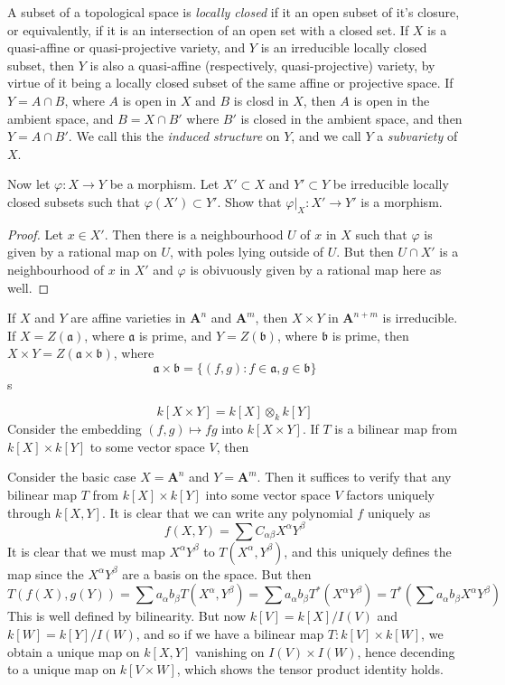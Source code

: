 A subset of a topological space is {\it locally closed} if it an open subset of it's closure, or equivalently, if it is an intersection of an open set with a closed set. If $X$ is a quasi-affine or quasi-projective variety, and $Y$ is an irreducible locally closed subset, then $Y$ is also a quasi-affine (respectively, quasi-projective) variety, by virtue of it being a locally closed subset of the same affine or projective space. If $Y = A \cap B$, where $A$ is open in $X$ and $B$ is closd in $X$, then $A$ is open in the ambient space, and $B = X \cap B'$ where $B'$ is closed in the ambient space, and then $Y = A \cap B'$. We call this the {\it induced structure} on $Y$, and we call $Y$ a {\it subvariety} of $X$.

\begin{theorem}
    Now let $\varphi: X \to Y$ be a morphism. Let $X' \subset X$ and $Y' \subset Y$ be irreducible locally closed subsets such that $\varphi(X') \subset Y'$. Show that $\varphi|_X: X' \to Y'$ is a morphism.
\end{theorem}
\begin{proof}
    Let $x \in X'$. Then there is a neighbourhood $U$ of $x$ in $X$ such that $\varphi$ is given by a rational map on $U$, with poles lying outside of $U$. But then $U \cap X'$ is a neighbourhood of $x$ in $X'$ and $\varphi$ is obivuously given by a rational map here as well.
\end{proof}

If $X$ and $Y$ are affine varieties in $\mathbf{A}^n$ and $\mathbf{A}^m$, then $X \times Y$ in $\mathbf{A}^{n+m}$ is irreducible. If $X = Z(\mathfrak{a})$, where $\mathfrak{a}$ is prime, and $Y = Z(\mathfrak{b})$, where $\mathfrak{b}$ is prime, then $X \times Y = Z(\mathfrak{a} \times \mathfrak{b})$, where
%
\[ \mathfrak{a} \times \mathfrak{b} = \{ (f,g) : f \in \mathfrak{a}, g \in \mathfrak{b} \} \]
%
s

\[ k[X \times Y] = k[X] \otimes_k k[Y] \]
%
Consider the embedding $(f,g) \mapsto fg$ into $k[X \times Y]$. If $T$ is a bilinear map from $k[X] \times k[Y]$ to some vector space $V$, then 

Consider the basic case $X = \mathbf{A}^n$ and $Y = \mathbf{A}^m$. Then it suffices to verify that any bilinear map $T$ from $k[X] \times k[Y]$ into some vector space $V$ factors uniquely through $k[X, Y]$. It is clear that we can write any polynomial $f$ uniquely as
%
\[ f(X,Y) = \sum C_{\alpha \beta} X^\alpha Y^\beta \]
%
It is clear that we must map $X^\alpha Y^\beta$ to $T(X^\alpha, Y^\beta)$, and this uniquely defines the map since the $X^\alpha Y^\beta$ are a basis on the space. But then
%
\[ T(f(X), g(Y)) = \sum a_\alpha b_\beta T(X^\alpha, Y^\beta) = \sum a_\alpha b_\beta T^*(X^\alpha Y^\beta) = T^* \left(\sum a_\alpha b_\beta X^\alpha Y^\beta \right) \]
%
This is well defined by bilinearity. But now $k[V] = k[X]/I(V)$ and $k[W] = k[Y]/I(W)$, and so if we have a bilinear map $T: k[V] \times k[W]$, we obtain a unique map on $k[X,Y]$ vanishing on $I(V) \times I(W)$, hence decending to a unique map on $k[V \times W]$, which shows the tensor product identity holds.

